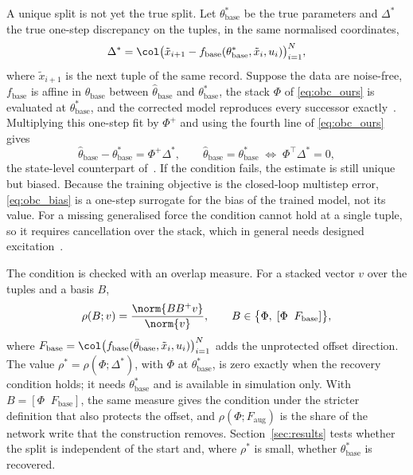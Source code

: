 A unique split is not yet the true split.
Let $\theta^*_{\mathrm{base}}$ be the true parameters and $\Delta^*$ the true
one-step discrepancy on the tuples, in the same normalised coordinates,
\begin{equation}
 \Delta^*=\col\bigl(\tilde x_{i+1}-f_{\mathrm{base}}(\theta^*_{\mathrm{base}},
 \tilde x_i,u_i)\bigr)_{i=1}^{N},
\label{eq:obc_delta}
\end{equation}
where $\tilde x_{i+1}$ is the next tuple of the same record.
Suppose the data are noise-free, $f_{\mathrm{base}}$ is affine in
$\theta_{\mathrm{base}}$ between $\hat\theta_{\mathrm{base}}$ and
$\theta^*_{\mathrm{base}}$, the stack $\Phi$ of \eqref{eq:obc_ours} is evaluated
at $\theta^*_{\mathrm{base}}$, and the corrected model reproduces every
successor exactly~\cite[Assumption~6]{gyorok2026obc}.
Multiplying this one-step fit by $\Phi^{+}$ and using the fourth line of
\eqref{eq:obc_ours} gives
\begin{equation}
 \hat\theta_{\mathrm{base}}-\theta^*_{\mathrm{base}}=\Phi^{+}\Delta^*,
 \qquad
 \hat\theta_{\mathrm{base}}=\theta^*_{\mathrm{base}}
 \;\Longleftrightarrow\;
 \Phi^\top\Delta^*=0,
\label{eq:obc_bias}
\end{equation}
the state-level counterpart of~\cite[Cond.~4, Eq.~(21)]{gyorok2026obc}.
If the condition fails, the estimate is still unique but biased.
Because the training objective is the closed-loop multistep error,
\eqref{eq:obc_bias} is a one-step surrogate for the bias of the trained model,
not its value.
For a missing generalised force the condition cannot hold at a single tuple,
so it requires cancellation over the stack, which in general needs designed
excitation~\cite[Remark~5]{gyorok2026obc}.

The condition is checked with an overlap measure.
For a stacked vector $v$ over the tuples and a basis $B$,
\begin{equation}
 \rho(B;v)=\frac{\norm{BB^{+}v}}{\norm{v}},
 \qquad
 B\in\bigl\{\Phi,\;[\Phi\;\;F_{\mathrm{base}}]\bigr\},
\label{eq:obc_overlap}
\end{equation}
where $F_{\mathrm{base}}=\col\bigl(f_{\mathrm{base}}(\bar\theta_{\mathrm{base}},
\tilde x_i,u_i)\bigr)_{i=1}^{N}$ adds the unprotected offset direction.
The value $\rho^*=\rho(\Phi;\Delta^*)$, with $\Phi$ at
$\theta^*_{\mathrm{base}}$, is zero exactly when the recovery condition holds;
it needs $\theta^*_{\mathrm{base}}$ and is available in simulation only.
With $B=[\Phi\;\;F_{\mathrm{base}}]$, the same measure gives the condition
under the stricter definition that also protects the offset, and
$\rho(\Phi;F_{\mathrm{aug}})$ is the share of the network write that the
construction removes.
Section~\ref{sec:results} tests whether the split is independent of the start
and, where $\rho^*$ is small, whether $\theta^*_{\mathrm{base}}$ is recovered.
